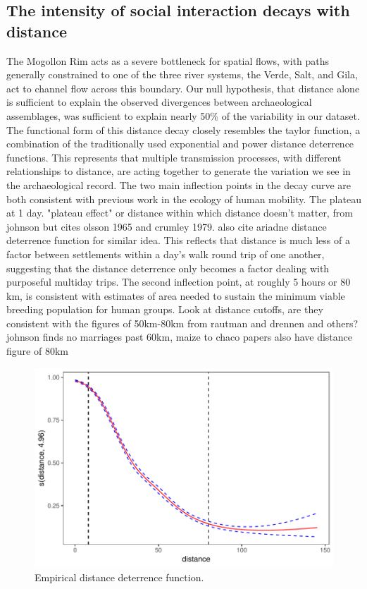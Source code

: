 \documentclass[fleqn,10pt]{wlscirep}
\begin{document}
\subsection*{The intensity of social interaction decays with distance}
The Mogollon Rim acts as a severe bottleneck for spatial flows, with paths generally constrained to one of the three river systems, the Verde, Salt, and Gila, act to channel flow across this boundary.  
Our null hypothesis, that distance alone is sufficient to explain the observed divergences between archaeological assemblages, was sufficient to explain nearly 50\% of the variability in our dataset. The functional form of this distance decay closely resembles the taylor function, a combination of the traditionally used exponential and power distance deterrence functions. This represents that multiple transmission processes, with different relationships to distance, are acting together to generate the variation we see in the archaeological record. The two main inflection points in the decay curve are both consistent with previous work in the ecology of human mobility. The plateau at 1 day. "plateau effect" or distance within which distance doesn't matter, from johnson but cites olsson 1965 and crumley 1979. also cite ariadne distance deterrence function for similar idea. This reflects that distance is much less of a factor between settlements within a day's walk round trip of one another, suggesting that the distance deterrence only becomes a factor dealing with purposeful multiday trips.  The second inflection point, at roughly 5 hours or 80 km, is consistent with estimates of area needed to sustain the minimum viable breeding population for human groups. Look at distance cutoffs, are they consistent with the figures of 50km-80km from rautman and drennen and others? johnson finds no marriages past 60km, maize to chaco papers also have distance figure of 80km

\begin{figure}[!htbp]
\centering
\includegraphics[width=.8\linewidth]{figures/distance_function.pdf}
\caption{Empirical distance deterrence function.}
\label{fig:distance}
\end{figure}
\end{document}
